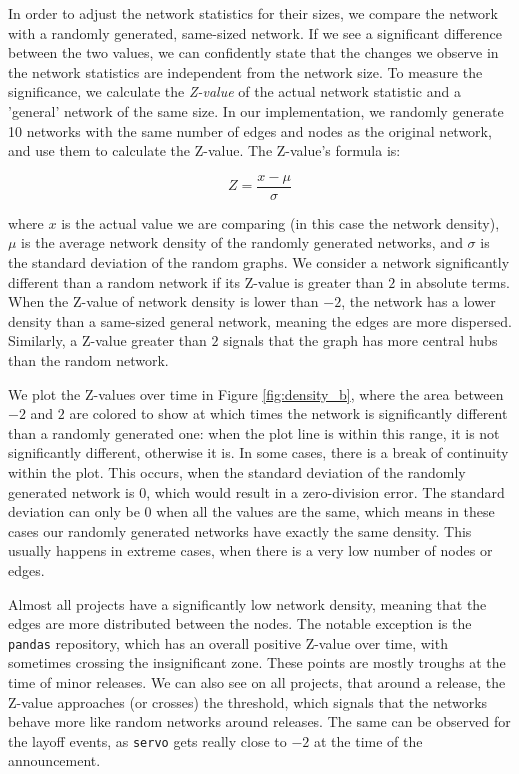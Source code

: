In order to adjust the network statistics for their sizes, we compare the network with a randomly generated, same-sized network. If we see a significant difference between the two values, we can confidently state that the changes we observe in the network statistics are independent from the network size. To measure the significance, we calculate the \textit{Z-value} of the actual network statistic and a 'general' network of the same size. In our implementation, we randomly generate 10 networks with the same number of edges and nodes as the original network, and use them to calculate the Z-value. The Z-value's formula is:

\[ Z=\frac{x-\mu}{\sigma} \]

where $x$ is the actual value we are comparing (in this case the network density), $\mu$ is the average network density of the randomly generated networks, and $\sigma$ is the standard deviation of the random graphs. We consider a network significantly different than a random network if its Z-value is greater than $2$ in absolute terms. When the Z-value of network density is lower than $-2$, the network has a lower density than a same-sized general network, meaning the edges are more dispersed. Similarly, a Z-value greater than $2$ signals that the graph has more central hubs than the random network.

We plot the Z-values over time in Figure \ref{fig:density_b}, where the area between $-2$ and $2$ are colored to show at which times the network is significantly different than a randomly generated one: when the plot line is within this range, it is not significantly different, otherwise it is. In some cases, there is a break of continuity within the plot. This occurs, when the standard deviation of the randomly generated network is $0$, which would result in a zero-division error. The standard deviation can only be $0$ when all the values are the same, which means in these cases our randomly generated networks have exactly the same density. This usually happens in extreme cases, when there is a very low number of nodes or edges.
  
Almost all projects have a significantly low network density, meaning that the edges are more distributed between the nodes. The notable exception is the \texttt{pandas} repository, which has an overall positive Z-value over time, with sometimes crossing the insignificant zone. These points are mostly troughs at the time of minor releases. We can also see on all projects, that around a release, the Z-value approaches (or crosses) the threshold, which signals that the networks behave more like random networks around releases. The same can be observed for the layoff events, as \texttt{servo} gets really close to $-2$ at the time of the announcement.

